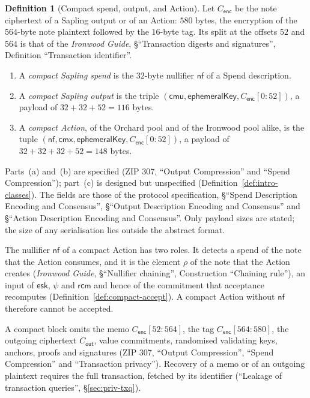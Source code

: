 \documentclass[11pt,a4paper]{article}
\theoremstyle{definition}
\newtheorem{definition}[theorem]{Definition}
\newcommand{\nfsym}{\mathsf{nf}}
\newcommand{\cmx}{\mathsf{cmx}}
\newcommand{\rcm}{\ensuremath{\mathsf{rcm}}}
\begin{document}
\begin{definition}[Compact spend, output, and Action]%
\label{def:compact-elements}
Let $C_{\mathsf{enc}}$ be the note ciphertext of a Sapling output or of an
Action: $580$ bytes, the encryption of the $564$-byte note plaintext
followed by the $16$-byte tag. Its split at the offsets $52$ and $564$ is
that of the \emph{Ironwood Guide}, \S``Transaction digests and signatures'',
Definition ``Transaction identifier''.
\begin{enumerate}[label=(\alph*)]
\item A \emph{compact Sapling spend} is the $32$-byte nullifier
  $\nfsym$ of a Spend description.
\item A \emph{compact Sapling output} is the triple
  $(\mathsf{cmu},\allowbreak \mathsf{ephemeralKey},\allowbreak
  C_{\mathsf{enc}}[0{:}52])$, a payload of $32 + 32 + 52 = 116$ bytes.
\item A \emph{compact Action}, of the Orchard pool and of the Ironwood pool
  alike, is the tuple $(\nfsym, \cmx, \mathsf{ephemeralKey},
  C_{\mathsf{enc}}[0{:}52])$, a payload of $32 + 32 + 32 + 52 = 148$ bytes.
\end{enumerate}
Parts~(a) and~(b) are specified (ZIP 307, ``Output Compression'' and
``Spend Compression''); part~(c) is designed but unspecified
(Definition~\ref{def:intro-classes}). The fields are those of the protocol
specification, \S``Spend Description Encoding and Consensus'', \S``Output
Description Encoding and Consensus'' and \S``Action Description Encoding
and Consensus''. Only payload sizes are stated; the size of any
serialisation lies outside the abstract format.
\end{definition}

The nullifier $\nfsym$ of a compact Action has two roles. It detects a spend
of the note that the Action consumes, and it is the element $\rho$ of the
note that the Action creates (\emph{Ironwood Guide}, \S``Nullifier
chaining'', Construction ``Chaining rule''), an input of $\mathsf{esk}$,
$\psi$ and $\rcm$ and hence of the commitment that acceptance recomputes
(Definition~\ref{def:compact-accept}). A compact Action without $\nfsym$
therefore cannot be accepted.

A compact block omits the memo $C_{\mathsf{enc}}[52{:}564]$, the tag
$C_{\mathsf{enc}}[564{:}580]$, the outgoing ciphertext $C_{\mathsf{out}}$,
value commitments, randomised validating keys, anchors, proofs and
signatures (ZIP 307, ``Output Compression'', ``Spend Compression'' and
``Transaction privacy''). Recovery of a memo or of an outgoing plaintext
requires the full transaction, fetched by its identifier (``Leakage of
transaction queries'', \S\ref{sec:priv-txq}).
\end{document}
